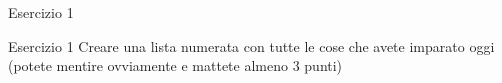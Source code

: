 \begin{frame}{Esercizio 1}

\begin{block}{Esercizio 1}
Creare una lista numerata con tutte le cose che avete imparato oggi (potete
mentire ovviamente e mattete almeno 3 punti)
\end{block}

\end{frame}